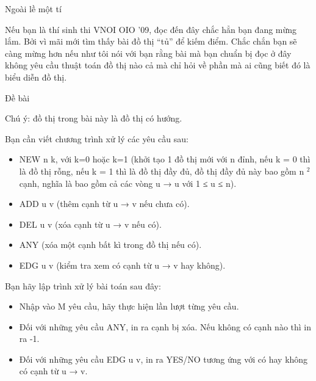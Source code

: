 Ngoài lề một tí     

   Nếu bạn là thí sinh thi VNOI OIO '09, đọc đến đây chắc hẳn bạn đang mừng lắm. Bởi vì mãi mới tìm thấy bài đồ thị “tủ” để kiếm điểm. Chắc chắn bạn sẽ càng mừng hơn nếu như tôi nói với bạn rằng bài mà bạn chuẩn bị đọc ở đây không yêu cầu thuật toán đồ thị nào cả mà chỉ hỏi về phần mà ai cũng biết đó là biểu diễn đồ thị.  

       Đề bài     

   Chú ý: đồ thị trong bài này là đồ thị có hướng.  

   Bạn cần viết chương trình xử lý các yêu cầu sau:  
\begin{itemize}
	\item     NEW n k, với k=0 hoặc k=1 (khởi tạo 1 đồ thị mới với n đỉnh, nếu k = 0 thì là đồ thị rỗng, nếu k = 1 thì là đồ thị đầy đủ, đồ thị đầy đủ này bao gồm n    $^     2    $    cạnh, nghĩa là bao gồm cả các vòng u → u với 1 ≤ u ≤ n).   
	\item     ADD u v (thêm cạnh từ u → v nếu chưa có).   
	\item     DEL u v (xóa cạnh từ u → v nếu có).   
	\item     ANY (xóa một cạnh bất kì trong đồ thị nếu có).   
	\item     EDG u v (kiểm tra xem có cạnh từ u → v hay không).   
\end{itemize}

   Bạn hãy lập trình xử lý bài toán sau đây:  
\begin{itemize}
	\item     Nhập vào M yêu cầu, hãy thực hiện lần lượt từng yêu cầu.   
	\item     Đối với những yêu cầu ANY, in ra cạnh bị xóa. Nếu không có cạnh nào thì in ra -1.   
	\item     Đối với những yêu cầu EDG u v, in ra YES/NO tương ứng với có hay không có cạnh từ u → v.   
\end{itemize}

\